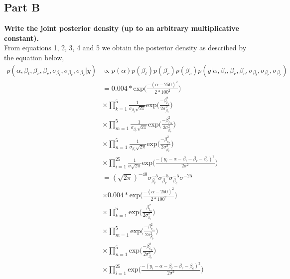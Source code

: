 \documentclass{article}
\begin{document}
\subsection{Part B}
\textbf{Write the joint posterior density (up to an arbitrary multiplicative constant).}\\
From equations 1, 2, 3, 4 and 5 we obtain the posterior density as described by the equation below,
\begin{align*}
p(\alpha, \beta_t, \beta_r, \beta_c, \sigma_{\beta_{t}},\sigma_{\beta_{r}},\sigma_{\beta_{c}} |y) &\propto p(\alpha)p(\beta_{t})p(\beta_r)p(\beta_c)p(y | \alpha, \beta_t, \beta_r, \beta_c, \sigma_{\beta_{t}},\sigma_{\beta_{r}},\sigma_{\beta_{c}})\\
&= 0.004*\text{exp}\Big(\frac{- (\alpha - 250)^2}{2*100^2}\Big)\\
& \times \prod_{k = 1}^{5}\frac{1}{\sigma_{\beta_t}\sqrt{2\pi}} \text{exp}\Big(\frac{- \beta^2_{t_{k}}}{2\sigma^2_{\beta_t}}\Big)\\
& \times \prod_{m = 1}^{5}\frac{1}{\sigma_{\beta_r}\sqrt{2\pi}} \text{exp}\Big(\frac{- \beta^2_{r_{m}}}{2\sigma^2_{\beta_r}}\Big)\\
 & \times \prod_{n = 1}^{5}\frac{1}{\sigma_{\beta_c}\sqrt{2\pi}} \text{exp}\Big(\frac{- \beta^2_{c_{n}}}{2\sigma^2_{\beta_c}}\Big)\\
& \times \prod_{i = 1}^{25} \frac{1}{\sigma \sqrt{2 \pi}} \text{exp}\Big(\frac{-(y_i -\alpha - \beta_t - \beta_r - \beta_c)^2}{2\sigma^2}\Big)\\
&= (\sqrt{2\pi}) ^ {-40} \sigma_{\beta_{t}}^{-5} \sigma_{\beta_{r}}^{-5} \sigma_{\beta_{c}}^{-5} \sigma^{-25} \\
&\times 0.004*\text{exp}\Big(\frac{- (\alpha - 250)^2}{2*100^2}\Big)\\
& \times \prod_{k = 1}^{5}\text{exp}\Big(\frac{- \beta^2_{t_{k}}}{2\sigma^2_{\beta_t}}\Big) \\    &\times \prod_{m = 1}^{5}\text{exp}\Big(\frac{- \beta^2_{r_{m}}}{2\sigma^2_{\beta_r}}\Big)\\   &\times \prod_{n = 1}^{5}\text{exp}\Big(\frac{- \beta^2_{c_{n}}}{2\sigma^2_{\beta_c}}\Big)\\
& \times \prod_{i = 1}^{25}\text{exp}\Big(\frac{-(y_i -\alpha - \beta_t - \beta_r - \beta_c)^2}{2\sigma^2}\Big)
\end{align*}
\end{document}
